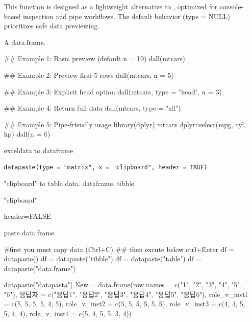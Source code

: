 \documentclass[a4paper]{book}
\begin{document}
%
\begin{Details}
This function is designed as a lightweight alternative to ,
optimized for console-based inspection and pipe  workflows.
The default behavior (type = NULL) prioritizes safe data previewing.
\end{Details}
%
\begin{Value}
A data.frame.
\end{Value}
%
\begin{Examples}
\begin{ExampleCode}
## Example 1: Basic preview (default n = 10)
dall(mtcars)

## Example 2: Preview first 5 rows
dall(mtcars, n = 5)

## Example 3: Explicit head option
dall(mtcars, type = "head", n = 3)

## Example 4: Return full data
dall(mtcars, type = "all")

## Example 5: Pipe-friendly usage
library(dplyr)
mtcars %
  dplyr::select(mpg, cyl, hp) %
  dall(n = 6)

\end{ExampleCode}
\end{Examples}
%
\begin{Description}
exceldata to dataframe
\end{Description}
%
\begin{Usage}
\begin{verbatim}
datapaste(type = "matrix", x = "clipboard", header = TRUE)
\end{verbatim}
\end{Usage}
%
\begin{Arguments}
\begin{ldescription}
\item[\code{type}] "clipboard" to table data. dataframe, tibble

\item[\code{x}] "clipboard"

\item[\code{header}] header=FALSE
\end{ldescription}
\end{Arguments}
%
\begin{Value}
paste data.frame
\end{Value}
%
\begin{Examples}
\begin{ExampleCode}
#first you must copy data (Ctrl+C)
## then excute below ctrl+Enter
df = datapaste()
df = datapaste("tibble")
df = datapaste("table")
df = datapaste("data.frame")


datapaste("datapasta")
New = data.frame(row.names = c("1", "2", "3", "4", "5", "6"),
                   응답자 = c("응답1", "응답2", "응답3", "응답4", "응답5", "응답6"),
                   role_v_inst1 = c(5, 5, 5, 5, 4, 5),
                   role_v_inst2 = c(5, 5, 5, 5, 5, 5),
                   role_v_inst3 = c(4, 4, 5, 5, 4, 4),
                   role_v_inst4 = c(5, 4, 5, 5, 3, 4))


\end{ExampleCode}
\end{Examples}
\end{document}
